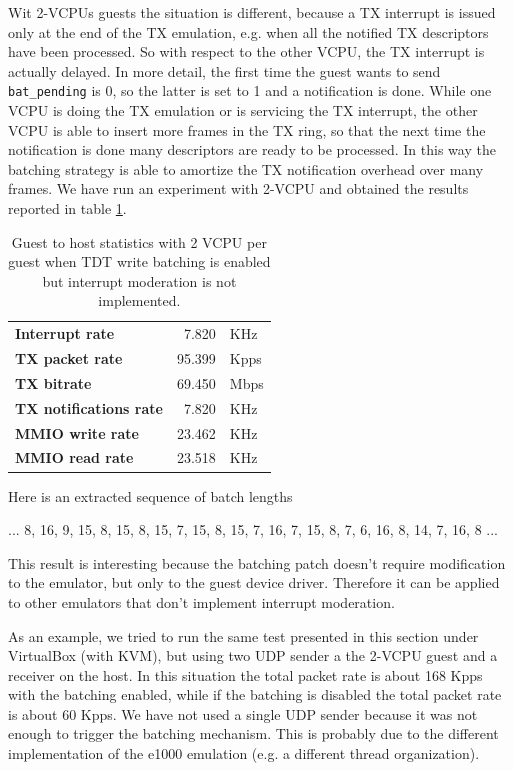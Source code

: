 \vspace{0.5cm}

Wit 2-VCPUs guests the situation is different, because a TX interrupt is issued only at the end of the TX emulation, e.g. when all the
notified TX descriptors have been processed. So with respect to the other VCPU, the TX interrupt is actually delayed.
In more detail, the first time the guest wants to send \texttt{bat\_pending} is 0, so the latter is set to 1 and a notification is done.
While one VCPU is doing the TX emulation or is servicing the TX interrupt, the other VCPU is able to insert more frames in the TX ring,
so that the next time the notification is done many descriptors are ready to be processed. In this way the batching strategy is able
to amortize the TX notification overhead over many frames. We have run an experiment with 2-VCPU and obtained the results reported in
table \ref{tab:e1000-bat-tx-g2h2vcpu}.

\begin{table}
\begin{center}
\begin{tabular}{lrl}
\toprule
\textbf{Interrupt rate} & 7.820 & KHz\\
\textbf{TX packet rate} & 95.399 & Kpps\\
\textbf{TX bitrate} & 69.450 & Mbps\\
\textbf{TX notifications rate} & 7.820 & KHz\\
\textbf{MMIO write rate} & 23.462 & KHz\\
\textbf{MMIO read rate} & 23.518 & KHz\\
\bottomrule
\end{tabular}
\end{center}
\caption{Guest to host statistics with 2 VCPU per guest when TDT write batching is enabled but interrupt moderation is not implemented.}
\label{tab:e1000-bat-tx-g2h2vcpu}
\end{table}

Here is an extracted sequence of batch lengths

\begin{center}
... 8, 16, 9, 15, 8, 15, 8, 15, 7, 15, 8, 15, 7, 16, 7, 15, 8, 7, 6, 16, 8, 14, 7, 16, 8 ...
\end{center}

\vspace{0.5cm}

This result is interesting because the batching patch doesn't require modification to the emulator, but only to the guest device driver.
Therefore it can be applied to other emulators that don't implement interrupt moderation.

As an example, we tried to run the same test presented in this section under VirtualBox (with KVM), but using two UDP sender a the 2-VCPU
guest and a receiver on the host. In this situation the total packet rate is about 168 Kpps with the batching enabled, while if
the batching is disabled the total packet rate is about 60 Kpps. We have not used a single UDP sender because it was not enough to trigger
the batching mechanism. This is probably due to the different implementation of the e1000 emulation (e.g. a different thread organization).


